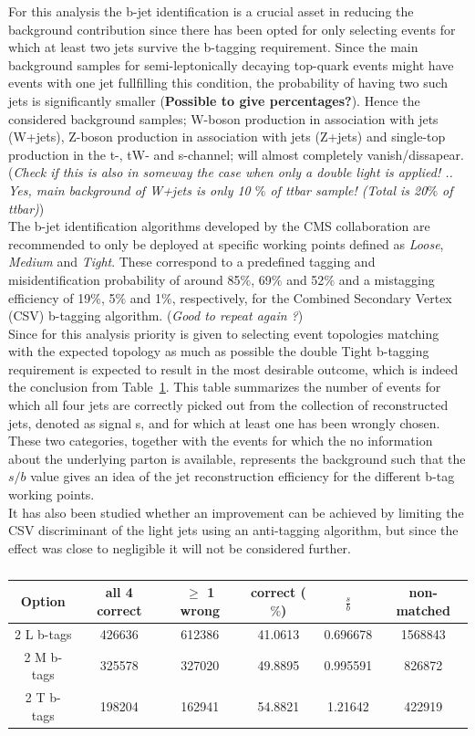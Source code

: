 For this analysis the b-jet identification is a crucial asset in reducing the background contribution since there has been opted for only selecting events for which at least two jets survive the b-tagging requirement. Since the main background samples for semi-leptonically decaying top-quark events might have events with one jet fullfilling this condition, the probability of having two such jets is significantly smaller (\textbf{Possible to give percentages?}). Hence the considered background samples; W-boson production in association with jets (W+jets), Z-boson production in association with jets (Z+jets) and single-top production in the t-, tW- and s-channel; will almost completely vanish/dissapear. (\textit{Check if this is also in someway the case when only a double light is applied! .. Yes, main background of W+jets is only 10 $\%$ of ttbar sample! (Total is 20$\%$ of ttbar)})
\\

The b-jet identification algorithms developed by the CMS collaboration are recommended to only be deployed at specific working points defined as \textit{Loose}, \textit{Medium} and \textit{Tight}.
These correspond to a predefined tagging and misidentification probability of around 85$\%$, 69$\%$ and 52$\%$ and a mistagging efficiency of 19$\%$, 5$\%$ and 1$\%$, respectively, for the Combined Secondary Vertex (CSV) b-tagging algorithm. (\textit{Good to repeat again ?})\\
Since for this analysis priority is given to selecting event topologies matching with the expected topology as much as possible the double Tight b-tagging requirement is expected to result in the most desirable outcome, which is indeed the conclusion from Table~\ref{table::bTagResults}.
This table summarizes the number of events for which all four jets are correctly picked out from the collection of reconstructed jets, denoted as signal s, and for which at least one has been wrongly chosen. These two categories, together with the events for which the no information about the underlying parton is available, represents the background such that the $s/b$ value gives an idea of the jet reconstruction efficiency for the different b-tag working points.
\\
It has also been studied whether an improvement can be achieved by limiting the CSV discriminant of the light jets using an anti-tagging algorithm, but since the effect was close to negligible it will not be considered further.
\begin{table}[h!t]
 \centering
 \caption{}\label{table::bTagResults}
 \begin{tabular}{c|c|c|c|c|c} 
  \textbf{Option} 	& all 4 correct 	& $\geq$ 1 wrong 	& correct ($\%$) 	& $\frac{s}{b}$ 	& non-matched 	\\ \hline 
  2 L b-tags		& 426636 		& 612386 		& 41.0613 		& 0.696678 		& 1568843	\\ 
  2 M b-tags 		& 325578 		& 327020 		& 49.8895 		& 0.995591 		& 826872	\\ 
  2 T b-tags 		& 198204 		& 162941 		& 54.8821 		& 1.21642 		& 422919	\\ 
 \end{tabular} 
\end{table}

